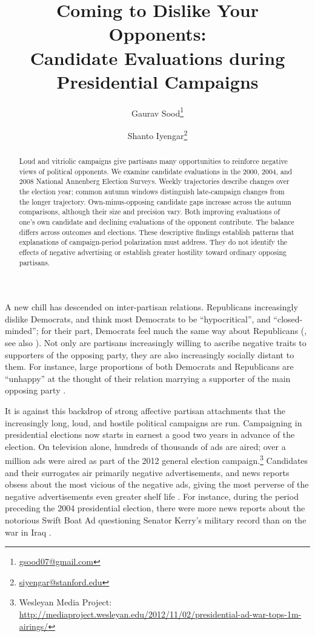 \documentclass[11pt,letterpaper]{article}
\title{Coming to Dislike Your Opponents:\\Candidate Evaluations during Presidential Campaigns}
\author{Gaurav Sood\thanks{\href{mailto:gsood07@gmail.com}{gsood07@gmail.com}} \and Shanto Iyengar\thanks{\href{mailto:siyengar@stanford.edu}{siyengar@stanford.edu}}}
\date{}
\begin{document}
\maketitle
\begin{abstract}
Loud and vitriolic campaigns give partisans many opportunities to reinforce negative views of political opponents. We examine candidate evaluations in the 2000, 2004, and 2008 National Annenberg Election Surveys. Weekly trajectories describe changes over the election year; common autumn windows distinguish late-campaign changes from the longer trajectory. Own-minus-opposing candidate gaps increase across the autumn comparisons, although their size and precision vary. Both improving evaluations of one's own candidate and declining evaluations of the opponent contribute. The balance differs across outcomes and elections. These descriptive findings establish patterns that explanations of campaign-period polarization must address. They do not identify the effects of negative advertising or establish greater hostility toward ordinary opposing partisans.
\end{abstract}
\newpage
A new chill has descended on inter-partisan relations. Republicans increasingly dislike Democrats, and think most Democrats to be ``hypocritical'', and ``closed-minded''; for their part, Democrats feel much the same way about Republicans (\citealt{iyengar2012}, see also \citealt{Iyengar2015, Mason2013}).  Not only are partisans increasingly willing to ascribe negative traits to supporters of the opposing party, they are also increasingly socially distant to them.  For instance, large proportions of both Democrats and Republicans are ``unhappy'' at the thought of their relation marrying a supporter of the main opposing party \citep{iyengar2012}.

It is against this backdrop of strong affective partisan attachments that the increasingly long, loud, and hostile political campaigns are run. Campaigning in presidential elections now starts in earnest a good two years in advance of the election. On television alone, hundreds of thousands of ads are aired; over a million ads were aired as part of the 2012 general election campaign.\footnote{Wesleyan Media Project: \href{http://mediaproject.wesleyan.edu/2012/11/02/presidential-ad-war-tops-1m-airings/}{http://mediaproject.wesleyan.edu/2012/11/02/presidential-ad-war-tops-1m-airings/}} Candidates and their surrogates air primarily negative advertisements, and news reports obsess about the most vicious of the negative ads, giving the most perverse of the negative advertisements even greater shelf life \citep{geer2010}. For instance, during the period preceding the 2004 presidential election, there were more news reports about the notorious Swift Boat Ad questioning Senator Kerry's military record than on the war in Iraq \citep{geer2010}.
\end{document}
